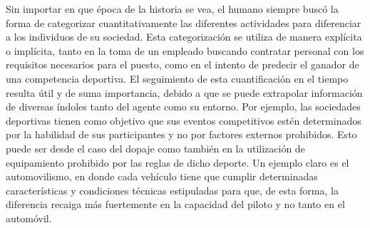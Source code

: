 \documentclass[11pt,twoside,spanish]{report} %
\begin{document}
Sin importar en que \'epoca de la historia se vea, el humano siempre busc\'o la forma de categorizar cuantitativamente las diferentes actividades para diferenciar a los individuos de su sociedad.
Esta categorizaci\'on se utiliza de manera expl\'icita o impl\'icita, tanto en la toma de un empleado buscando contratar personal con los requisitos necesarios para el puesto, como en el intento de predecir el ganador de una competencia deportiva.
El seguimiento de esta cuantificaci\'on en el tiempo resulta \'util y de suma importancia, debido a que se puede extrapolar informaci\'on de diversas \'indoles tanto del agente como su entorno.
Por ejemplo, las sociedades deportivas tienen como objetivo que sus eventos competitivos est\'en determinados por la habilidad de sus participantes y no por factores externos prohibidos.
Esto puede ser desde el caso del dopaje como tambi\'en en la utilizaci\'on de equipamiento prohibido por las reglas de dicho deporte.
Un ejemplo claro es el automovilismo, en donde cada veh\'iculo tiene que cumplir determinadas caracter\'isticas y condiciones t\'ecnicas estipuladas para que, de esta forma, la diferencia recaiga m\'as fuertemente en la capacidad del piloto y no tanto en el autom\'ovil.
\end{document}
